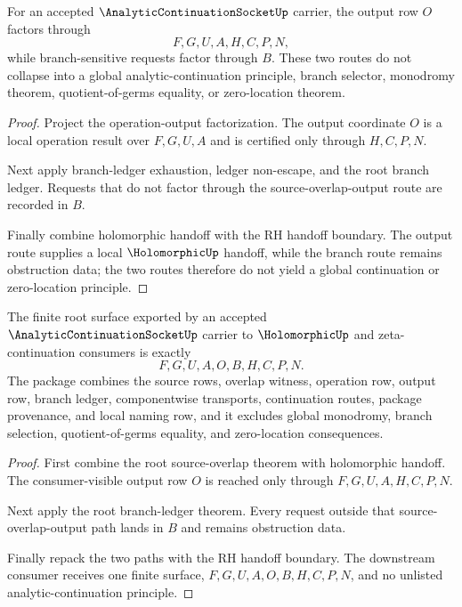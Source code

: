 \begin{theorem}
\label{thm:analytic-continuation-socket-output-branch-separation}
For an accepted $\AnalyticContinuationSocketUp$ carrier, the output row $O$
factors through
$$
F,G,U,A,H,C,P,N,
$$
while branch-sensitive requests factor through $B$. These two routes do not
collapse into a global analytic-continuation principle, branch selector,
monodromy theorem, quotient-of-germs equality, or zero-location theorem.
\end{theorem}
\begin{proof}
Project the operation-output factorization. The output coordinate $O$ is a
local operation result over $F,G,U,A$ and is certified only through
$H,C,P,N$.

Next apply branch-ledger exhaustion, ledger non-escape, and the root branch
ledger. Requests that do not factor through the source-overlap-output route
are recorded in $B$.

Finally combine holomorphic handoff with the RH handoff boundary. The output
route supplies a local $\HolomorphicUp$ handoff, while the branch route
remains obstruction data; the two routes therefore do not yield a global
continuation or zero-location principle.
\end{proof}

\begin{theorem}
\label{thm:analytic-continuation-socket-root-downstream-unblock}
The finite root surface exported by an accepted
$\AnalyticContinuationSocketUp$ carrier to $\HolomorphicUp$ and
zeta-continuation consumers is exactly
$$
F,G,U,A,O,B,H,C,P,N.
$$
The package combines the source rows, overlap witness, operation row, output
row, branch ledger, componentwise transports, continuation routes, package
provenance, and local naming row, and it excludes global monodromy, branch
selection, quotient-of-germs equality, and zero-location consequences.
\end{theorem}
\begin{proof}
First combine the root source-overlap theorem with holomorphic handoff. The
consumer-visible output row $O$ is reached only through $F,G,U,A,H,C,P,N$.

Next apply the root branch-ledger theorem. Every request outside that
source-overlap-output path lands in $B$ and remains obstruction data.

Finally repack the two paths with the RH handoff boundary. The downstream
consumer receives one finite surface, $F,G,U,A,O,B,H,C,P,N$, and no unlisted
analytic-continuation principle.
\end{proof}

